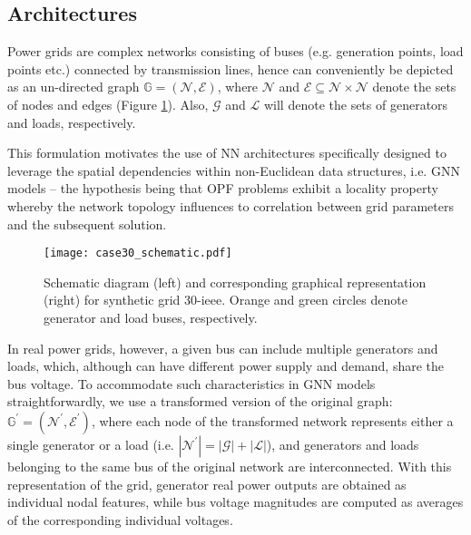 \documentclass[journal]{IEEEtran}
\newcommand{\Graph}{\mathbb{G}}
\newcommand{\Node}{\mathcal{N}}
\newcommand{\Edge}{\mathcal{E}}
\newcommand{\Load}{\mathcal{L}}
\newcommand{\Generator}{\mathcal{G}}
\begin{document}
\subsection{Architectures}
Power grids are complex networks consisting of buses (e.g. generation points, load points etc.) connected by transmission lines, hence can conveniently be depicted as an un-directed graph $\Graph = (\Node, \Edge)$, where $\Node$ and $\Edge \subseteq \Node \times \Node$ denote the sets of nodes and edges (Figure \ref{fig:graph}). Also, $\mathcal{G}$ and $\mathcal{L}$ will denote the sets of generators and loads, respectively.

This formulation motivates the use of NN architectures specifically designed to leverage the spatial dependencies within non-Euclidean data structures, i.e. GNN models -- the hypothesis being that OPF problems exhibit a locality property whereby the network topology influences to correlation between grid parameters and the subsequent solution.

\begin{figure}[!ht]
    \centerline{\texttt{[image: case30\_schematic.pdf]}}
    \caption{Schematic diagram \cite{UW2021} (left) and corresponding graphical representation (right) for synthetic grid 30-ieee. Orange and green circles denote generator and load buses, respectively.}
    \label{fig:graph}
\end{figure}

In real power grids, however, a given bus can include multiple generators and loads, which, although can have different power supply and demand, share the bus voltage. To accommodate such characteristics in GNN models straightforwardly, we use a transformed version of the original graph: $\Graph^\prime = (\Node^\prime, \Edge^\prime)$, where each node of the transformed network represents either a single generator or a load (i.e. $|\Node^\prime| = |\Generator| + |\Load|$), and generators and loads belonging to the same bus of the original network are interconnected. With this representation of the grid, generator real power outputs are obtained as individual nodal features, while bus voltage magnitudes are computed as averages of the corresponding individual voltages.
\end{document}
